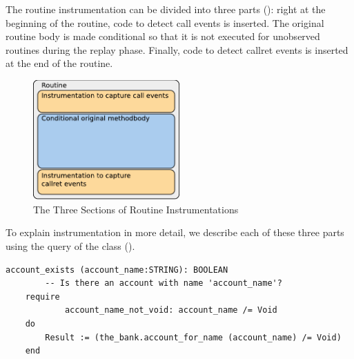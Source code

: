 The routine instrumentation can be divided into three parts (): right at the beginning of the routine, code to detect call events is inserted. The original routine body is made conditional so that it is not executed for unobserved routines during the replay phase. Finally, code to detect callret events is inserted at the end of the routine.
\begin{figure}[ht]
  \centering
  \includegraphics[width=0.5\textwidth]{illustrations/routine_instrumentation_structure}
  \caption{The Three Sections of Routine Instrumentations}
  \label{fig:routine_instrumentation_structure}
\end{figure}

To explain instrumentation in more detail, we describe each of these three parts using the query  of the class  ().

\begin{lstlisting}[caption=Original Code of Query \feature{account\_exists} ,label=lst:account_exists_original]
account_exists (account_name:STRING): BOOLEAN
		-- Is there an account with name 'account_name'?
	require
			account_name_not_void: account_name /= Void
	do
		Result := (the_bank.account_for_name (account_name) /= Void)
	end
\end{lstlisting}

